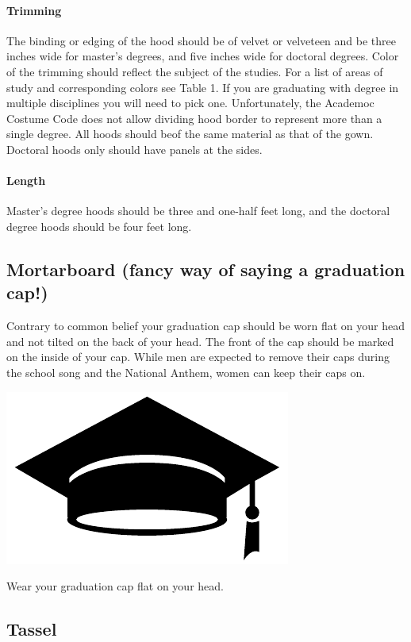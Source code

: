 \documentclass{tufte-handout}
\begin{document}
\paragraph{Trimming}The binding or edging of the hood should be of velvet or velveteen and be three inches wide for master's degrees, and five inches wide for doctoral degrees. Color of the trimming should reflect the subject of the studies. For a list of areas of study and corresponding colors see Table 1. If you are graduating with degree in multiple disciplines you will need to pick one. Unfortunately, the Academoc Costume Code does not allow dividing hood border to represent more than a single degree. All hoods should beof the same material as that of the gown. Doctoral hoods only should have panels at the sides.
\paragraph{Length} Master's degree hoods should be three and one-half feet long, and the doctoral degree hoods should be four feet long. 
 
\subsection{Mortarboard (fancy way of saying a graduation cap!)}
Contrary to common belief your graduation cap should be worn flat on your head and not tilted on the back of your head. The front of the cap should be marked on the inside of your cap.
While men are expected to remove their caps during the school song and the National Anthem, women can keep their caps on.

\begin{marginfigure}[-10\baselineskip]%
  \includegraphics[width=.5\linewidth]{cap-flat}
  \caption{\linespread{1.3}\selectfont{}Wear your graduation cap flat on your head.}
  \label{fig:flat}
\end{marginfigure}

\subsection{Tassel}
\end{document}
